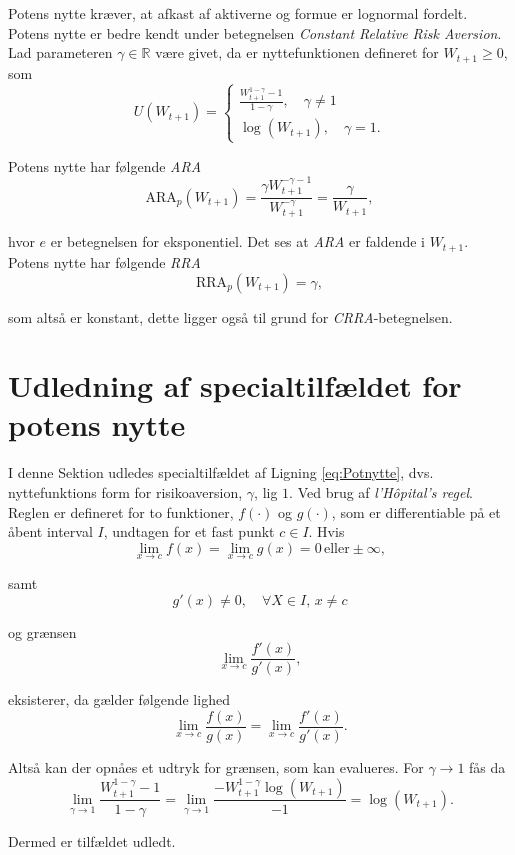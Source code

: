 \documentclass[
  a4paper,
  oneside]{memoir}
\begin{document}
Potens nytte kræver, at afkast af aktiverne og formue er lognormal fordelt. Potens nytte er bedre kendt under betegnelsen \emph{Constant Relative Risk Aversion}. Lad parameteren \(\gamma\in\mathbb{R}\) være givet, da er nyttefunktionen defineret for \(W_{t+1}\geq 0\), som
\[U(W_{t+1})=\begin{cases} \frac{W_{t+1}^{1-\gamma}-1}{1-\gamma},\quad \gamma\neq 1\\
\log(W_{t+1}),\quad \gamma = 1. \end{cases}\]

Potens nytte har følgende \emph{ARA}
\[\text{ARA}_p(W_{t+1})= \frac{\gamma W_{t+1}^{-\gamma-1}}{W_{t+1}^{-\gamma}}=\frac{\gamma}{W_{t+1}},\]

hvor \(e\) er betegnelsen for eksponentiel. Det ses at \emph{ARA} er faldende i \(W_{t+1}\). Potens nytte har følgende \emph{RRA}
\[\text{RRA}_p(W_{t+1})= \gamma,\]

som altså er konstant, dette ligger også til grund for \emph{CRRA}-betegnelsen.

\hypertarget{udledning-af-specialtilfuxe6ldet-for-potens-nytte}{%
\section{Udledning af specialtilfældet for potens nytte}\label{udledning-af-specialtilfuxe6ldet-for-potens-nytte}}

I denne Sektion udledes specialtilfældet af Ligning \eqref{eq:Potnytte}, dvs. nyttefunktions form for risikoaversion, \(\gamma\), lig \(1\). Ved brug af \emph{l'Hôpital's regel}. Reglen er defineret for to funktioner, \(f(\cdot)\) og \(g(\cdot)\), som er differentiable på et åbent interval \(I\), undtagen for et fast punkt \(c\in I\). Hvis
\[\lim_{x\to c} f(x)=\lim_{x\to c}g(x)=0\,\text{eller} \pm \infty,\]

samt
\[g'(x)\neq 0,\quad \forall X\in I,\,x\neq c\]

og grænsen
\[\lim_{x\to c} \frac{f'(x)}{g'(x)},\]

eksisterer, da gælder følgende lighed
\[\lim_{x\to c}\frac{f(x)}{g(x)}=\lim_{x\to c}\frac{f'(x)}{g'(x)}.\]

Altså kan der opnåes et udtryk for grænsen, som kan evalueres. For \(\gamma\rightarrow 1\) fås da
\[\lim_{\gamma\to 1}\frac{W_{t+1}^{1-\gamma}-1}{1-\gamma}=\lim_{\gamma\to 1}\frac{-W_{t+1}^{1-\gamma}\log\left(W_{t+1}\right)}{-1}=\log\left(W_{t+1}\right).\]

Dermed er tilfældet udledt.
\end{document}
